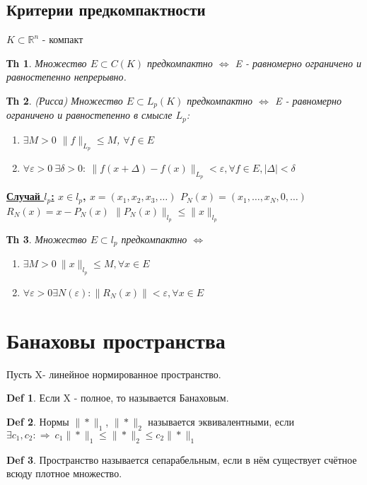 \documentclass[14pt]{article}
\theoremstyle{plain}
\newtheorem{Thm}{Тh}
\theoremstyle{definition}
\newtheorem{Def}{Def}
\begin{document}
 			\subsection{Критерии предкомпактности}
 				$K \subset \mathbb{R}^n$ - компакт
 				\begin{Thm}
 					Множество $E \subset C(K)$ предкомпактно $\Leftrightarrow$ E - равномерно ограничено и равностепенно непрерывно. 
 				\end{Thm}
 				\begin{Thm}
 					(Рисса)
 					Множество $E \subset L_p(K)$ предкомпактно $\Leftrightarrow$ E - равномерно ограничено и равностепенно в смысле $L_p$: 
 					\begin{enumerate}
 						\item $\exists M > 0$ $\|f\|_{L_p} \leq M$, $\forall f \in E$
 						\item $\forall \varepsilon > 0 \ \exists \delta > 0: \ \|f(x+\Delta) - f(x)\|_{L_p} < \varepsilon, \forall f \in E, |\Delta| < \delta$
 					\end{enumerate}
 				\end{Thm}
 				\bf{\underline{Случай $l_p$:}}\newline
 				$x \in l_p$, $x = (x_1, x_2, x_3, \dots)$ \newline
 				$P_N(x) = (x_1, \dots, x_N, 0, \dots)$\newline
 				$R_N(x) = x - P_N(x)$ \newline
 				$\|P_N(x)\|_{l_p} \leq \|x\|_{l_p}$
 				\begin{Thm}
 					Множество $E \subset l_p$ предкомпактно $\Leftrightarrow$ 
 					\begin{enumerate}
 						\item $\exists M> 0 \ \|x\|_{l_p} \leq M, \forall x \in E$
 						\item $\forall \varepsilon > 0 \exists N(\varepsilon): \|R_N(x) \| < \varepsilon, \forall x \in E$
 					\end{enumerate}
 				\end{Thm}
 	\section{Банаховы пространства}
 		Пусть X- линейное нормированное пространство. 
 		\begin{Def}
 			Если X - полное, то называется Банаховым. 
 		\end{Def}
 		\begin{Def}
 			Нормы $\|* \|_1$, $\|* \|_2$ называется эквивалентными, если $\exists c_1, c_2: \Rightarrow \ c_1 \|*\|_1 \leq \|*\|_2 \leq c_2 \|*\|_1$
 		\end{Def}
 		\begin{Def}
 			Пространство называется сепарабельным, если в нём существует счётное всюду плотное множество.
 		\end{Def}
\end{document}
